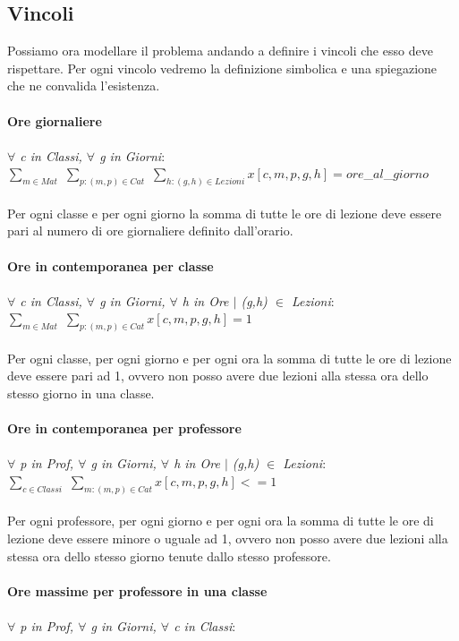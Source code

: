 \documentclass{article}
\begin{document}
\subsection{Vincoli}
Possiamo ora modellare il problema andando a definire i vincoli che esso deve rispettare. Per ogni vincolo vedremo la definizione simbolica e una spiegazione che ne convalida l'esistenza.
\\\\\textbf{Ore giornaliere}
	\\\\\emph{$\forall$ c in Classi, $\forall$ g in Giorni}: 
	\\$\sum_{m \in Mat}$ $\sum_{p : (m,p) \in Cat}$ $\sum_{h :(g,h)\in Lezioni}x[c,m,p,g,h] = ore$\_$al$\_$giorno$
\\\\Per ogni classe e per ogni giorno la somma di tutte le ore di lezione deve essere pari al numero di ore giornaliere definito dall'orario.
\\\\\textbf{Ore in contemporanea per classe}
	\\\\\emph{$\forall$ c in Classi, $\forall$ g in Giorni, $\forall$ h in Ore $\mid$ (g,h)  $\in$ Lezioni}: 
	\\$\sum_{m \in Mat}$ $\sum_{p : (m,p) \in Cat}x[c,m,p,g,h] = 1$
\\\\Per ogni classe, per ogni giorno e per ogni ora la somma di tutte le ore di lezione deve essere pari ad 1, ovvero non posso avere due lezioni alla stessa ora dello stesso giorno in una classe.
\\\\\textbf{Ore in contemporanea per professore}
	\\\\\emph{$\forall$ p in Prof, $\forall$ g in Giorni, $\forall$ h in Ore $\mid$ (g,h)  $\in$ Lezioni}: 
	\\$\sum_{c \in Classi}$ $\sum_{m : (m,p) \in Cat}x[c,m,p,g,h] <= 1$
\\\\Per ogni professore, per ogni giorno e per ogni ora la somma di tutte le ore di lezione deve essere minore o uguale ad 1, ovvero non posso avere due lezioni alla stessa ora dello stesso giorno tenute dallo stesso professore.
\\\\\textbf{Ore massime per professore in una classe}
	\\\\\emph{$\forall$ p in Prof, $\forall$ g in Giorni, $\forall$ c in Classi}:
\end{document}

